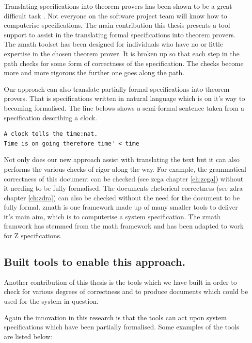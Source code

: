 Translating specifications into theorem provers has been shown to be a great difficult task \cite{johnharrisonslides}. Not everyone on the software project team will know how to computerise specifications. The main contribution this thesis presents a tool support to assist in the translating formal specifications into theorem provers. The \gls{zmath} toolset has been designed for individuals who have no or little expertise in the chosen theorem prover. It is broken up so that each step in the path checks for some form of correctness of the specification. The checks become more and more rigorous the further one goes along the path.

Our approach can also translate partially formal specifications into theorem provers. That is specifications written in natural language which is on it's way to becoming formalised. The line belows shows a semi-formal sentence taken from a specification describing a clock.

\begin{verbatim}
A clock tells the time:nat.
Time is on going therefore time' < time
\end{verbatim}

Not only does our new approach assist with translating the text but it can also performs the various checks of rigor along the way. For example, the grammatical correctness of this document can be checked (see \gls{zcga} chapter \ref{ch:zcga}) without it needing to be fully formalised. The documents rhetorical correctness (see \gls{zdra} chapter \ref{ch:zdra}) can also be checked without the need for the document to be fully formal. \Gls{zmath} is one framework made up of many smaller tools to deliver it's main aim, which is to computerise a system specification. The \gls{zmath} framwork has stemmed from the \gls{math} framework \cite{mathintomizar} and has been adapted to work for Z specifications.

\subsection{Built tools to enable this approach.}

Another contribution of this thesis is the tools which we have built in order to check for various degrees of correctness and to produce documents which could be used for the system in question.

Again the innovation in this research is that the tools can act upon system specifications which have been partially formalised. Some examples of the tools are listed below:

